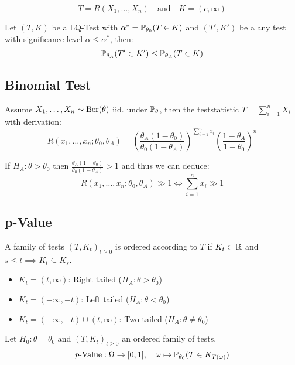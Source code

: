\begin{definition*} \vspace{-7pt}
  \[T = R(X_1, \ldots, X_n) \quad \text{and} \quad K = (c, \infty)\]
\end{definition*}

\begin{theorem*}
  Let \((T, K)\) be a LQ-Test with \(\alpha^* = \P_{\theta_0}(T \in K)\) and \((T', K')\) be a any test with significance level \(\alpha \leq \alpha^*\), then:
  \[\P_{\theta_A}(T' \in K') \leq \P_{\theta_A}(T \in K)\]
\end{theorem*}

\subsection{Binomial Test}
Assume \(X_1, \ldots, X_n \sim \Ber(\theta)\) iid. under \(\P_\theta\), then the teststatistic \(T = \sum_{i = 1}^n X_i\) with derivation: 
\[R\left(x_1, \ldots, x_n ; \theta_0, \theta_A\right) = \left(\frac{\theta_A\left(1-\theta_0\right)}{\theta_0\left(1-\theta_A\right)}\right)^{\sum_{i=1}^n x_i}\left(\frac{1-\theta_A}{1-\theta_0}\right)^n\]

If \(H_A: \theta > \theta_0\) then \(\frac{\theta_A\left(1-\theta_0\right)}{\theta_0\left(1-\theta_A\right)} > 1\) and thus we can deduce: 
\[R\left(x_1, \ldots, x_n ; \theta_0, \theta_A\right) \gg 1 \iff \sum_{i=1}^n x_i \gg 1\]

\subsection{p-Value}
\begin{definition*}
  A family of tests \((T, K_t)_{t \geq 0}\) is ordered according to \(T\) if \(K_t \subset \R\) and \(s \leq t \implies K_t \subseteq K_s\).
  \begin{itemize}
    \item \(K_t = (t, \infty)\): Right tailed (\(H_A: \theta > \theta_0\))
    \item \(K_t = (-\infty, -t)\): Left tailed (\(H_A: \theta < \theta_0\))
    \item \(K_t = (-\infty, -t) \cup (t, \infty)\): Two-tailed (\(H_A: \theta \neq \theta_0\))
  \end{itemize}
\end{definition*}

\begin{definition*}[\(p\)-Value]
  Let \(H_0: \theta = \theta_0\) and \((T, K_t)_{t \geq 0}\) an ordered family of tests.
  \[\text{\(p\)-Value}: \Omega \to [0, 1], \quad \omega \mapsto \P_{\theta_0}(T \in K_{T(\omega)})\]
\end{definition*}

